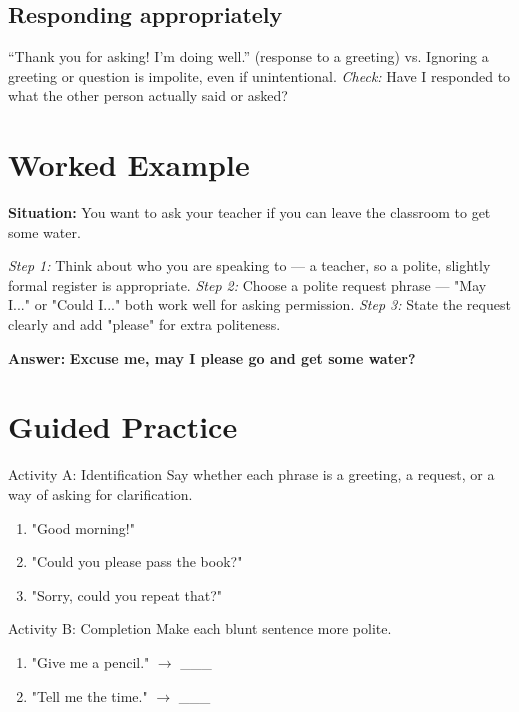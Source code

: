 \subsection*{Responding appropriately}
``Thank you for asking! I'm doing well.'' (response to a greeting) vs. Ignoring a greeting or question is impolite, even if unintentional. \textit{Check:} Have I responded to what the other person actually said or asked?

\section{Worked Example}
\begin{examplebox}
\textbf{Situation:} You want to ask your teacher if you can leave the classroom to get some water.

\textit{Step 1:} Think about who you are speaking to — a teacher, so a polite, slightly formal register is appropriate.
\textit{Step 2:} Choose a polite request phrase — "May I..." or "Could I..." both work well for asking permission.
\textit{Step 3:} State the request clearly and add "please" for extra politeness.

\textbf{Answer:} \textbf{Excuse me, may I please go and get some water?}
\end{examplebox}

\section{Guided Practice}
\begin{activitybox}{Activity A: Identification}
Say whether each phrase is a greeting, a request, or a way of asking for clarification.
\begin{enumerate}
    \item "Good morning!"
    \item "Could you please pass the book?"
    \item "Sorry, could you repeat that?"
\end{enumerate}
\end{activitybox}

\begin{activitybox}{Activity B: Completion}
Make each blunt sentence more polite.
\begin{enumerate}
    \item "Give me a pencil." $\rightarrow$ \_\_\_
    \item "Tell me the time." $\rightarrow$ \_\_\_
\end{enumerate}
\end{activitybox}

